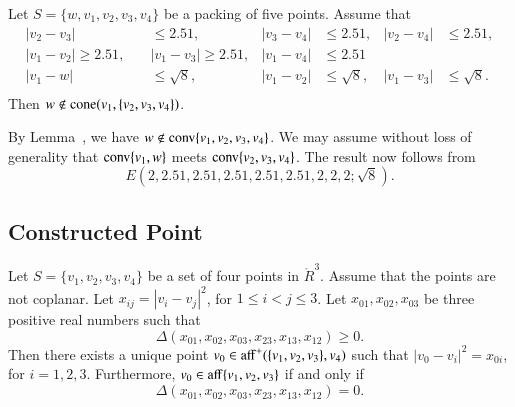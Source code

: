 \begin{tarskidata}
\begin{tarski}
\begin{lemma}
Let $S=\{w,v_1,v_2,v_3,v_4\}$ be a packing of five points.
Assume that
  $$
  \begin{array}{rlrlrlrlrllll}
  |v_2-v_3|&\le 2.51,& |v_3-v_4|&\le 2.51,  &|v_2-v_4|&\le 2.51,\\
  |v_1-v_2|\ge 2.51,\quad &|v_1-v_3|\ge 2.51,&|v_1-v_4|&\le 2.51\\
  |v_1-w|&\le \sqrt8,&|v_1-v_2|&\le \sqrt8,&|v_1-v_3|&\le\sqrt8.\\
  \end{array}
$$
Then $w\not\in {\operatorname{cone}}(v_1,\{v_2,v_3,v_4\})$.
\end{lemma}

\begin{proved}
By Lemma~, we have $w\not\in{\operatorname{conv}}\{v_1,v_2,v_3,v_4\}$.
We may assume without loss of generality that
${\operatorname{conv}}\{v_1,w\}$ meets ${\operatorname{conv}}\{v_2,v_3,v_4\}$.  The result
now follows from
    $$
    E(2,2.51,2.51,2.51,2.51,2.51,2,2,2;  \sqrt{8}).
    $$
\swallowed\end{proved}
\end{tarski}







\begin{tarski}
\section{Constructed Point}

\begin{lemma}
Let $S=\{v_1,v_2,v_3,v_4\}$ be a set of four points
in $\ring{R}^3$.  Assume that the points are not coplanar.
Let $x_{ij} = |v_i-v_j|^2$, for $1\le i < j\le 3$.
Let $x_{01},x_{02},x_{03}$ be three positive real numbers such that
$$
  \Delta(x_{01},x_{02},x_{03},x_{23},x_{13},x_{12})\ge0.
$$
Then there exists a unique point $v_0\in{\operatorname{aff}}^+(\{v_1,v_2,v_3\},v_4)$
such that
   $|v_0-v_i|^2 = x_{0i}$, for $i=1,2,3$.
Furthermore, $v_0\in{\operatorname{aff}}\{v_1,v_2,v_3\}$ if and only if 
 $$
  \Delta(x_{01},x_{02},x_{03},x_{23},x_{13},x_{12})=0.
$$
\end{lemma}


\end{tarski}
\end{tarskidata}
